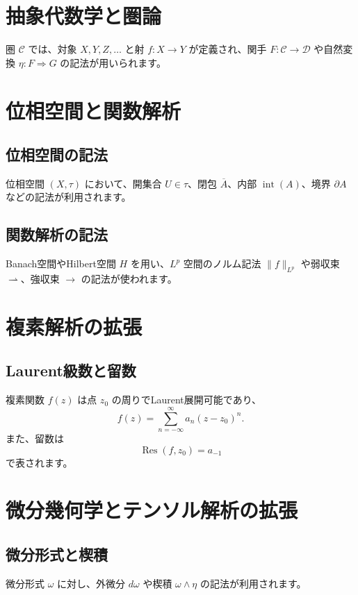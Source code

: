 \documentclass{ltjsarticle} %
\begin{document}

\section{抽象代数学と圏論}
圏 \(\mathcal{C}\) では、対象 \(X, Y, Z, \dots\) と射 \(f: X \to Y\) が定義され、関手 \(F: \mathcal{C} \to \mathcal{D}\) や自然変換 \(\eta: F \Rightarrow G\) の記法が用いられます。

\section{位相空間と関数解析}
\subsection{位相空間の記法}
位相空間 \( (X, \tau) \) において、開集合 \( U \in \tau \)、閉包 \( \overline{A} \)、内部 \( \operatorname{int}(A) \)、境界 \( \partial A \) などの記法が利用されます。

\subsection{関数解析の記法}
Banach空間やHilbert空間 \( H \) を用い、\( L^p \) 空間のノルム記法 \( \| f \|_{L^p} \) や弱収束 \( \rightharpoonup \)、強収束 \( \to \) の記法が使われます。

\section{複素解析の拡張}
\subsection{Laurent級数と留数}
複素関数 \( f(z) \) は点 \( z_0 \) の周りでLaurent展開可能であり、
\[
  f(z) = \sum_{n=-\infty}^{\infty} a_n (z - z_0)^n.
\]
また、留数は
\[
  \operatorname{Res}(f, z_0) = a_{-1}
\]
で表されます。

\section{微分幾何学とテンソル解析の拡張}
\subsection{微分形式と楔積}
微分形式 \( \omega \) に対し、外微分 \( d\omega \) や楔積 \( \omega \wedge \eta \) の記法が利用されます。
\end{document}
